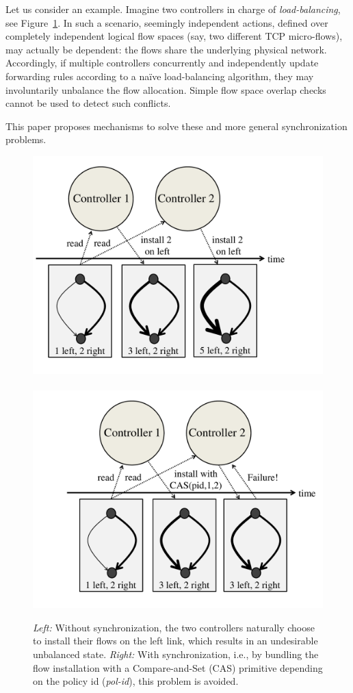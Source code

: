 \documentclass{sig-alternate-2006}
\newcommand{\pid}{\textit{pol-id}\xspace}
\begin{document}
Let us consider an example.
Imagine two controllers
in charge
of \emph{load-balancing}, see Figure~\ref{fig:CAS-example}.
In such a scenario, seemingly independent actions, defined over
completely independent logical flow spaces (say, two different
TCP micro-flows),
may actually be dependent: the flows share the underlying physical network.
Accordingly, if multiple controllers concurrently and independently
update forwarding rules according to a na\"ive load-balancing algorithm,
they may involuntarily
unbalance the flow allocation.
Simple flow space overlap checks cannot be used to detect
such conflicts.


This paper proposes mechanisms to solve these and more general 
synchronization problems.


\begin{figure}[t]
\centering
\includegraphics[width=.56\columnwidth]{loadbal-1.pdf}~\hspace{-.7cm}
~\includegraphics[width=.56\columnwidth]{loadbal-2.pdf}\\
\caption{\small \emph{Left:} Without synchronization, the two controllers naturally choose to
install their flows on the left link, which results in an undesirable
unbalanced state.
 \emph{Right:}
 With synchronization, i.e., by bundling the flow installation with a Compare-and-Set (CAS) primitive
 depending on the policy id (\emph{\pid}), this problem is avoided.}\label{fig:CAS-example}
\end{figure}
\end{document}
